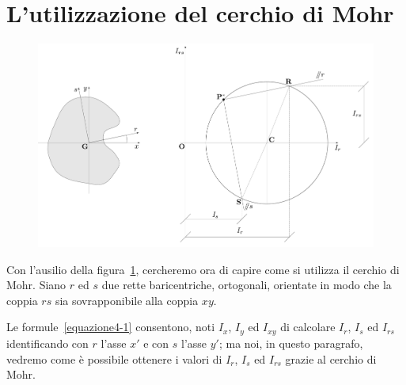 \section{L'utilizzazione del cerchio di Mohr}
\renewcommand{\thefigure}{5~-~2}
\begin{figure}[ht]
\centering
\includegraphics[width=\textwidth]{Immagini/Parte_5/Figura5_2/Figura5_2.pdf}
\caption{}
\label{figura5-2}
\end{figure}
\noindent Con l'ausilio della figura~\ref{figura5-2}, cercheremo ora di capire come si utilizza il cerchio di Mohr. Siano $r$ ed $s$ due rette baricentriche, ortogonali, orientate in modo che la coppia $rs$ sia sovrapponibile alla coppia $xy$. 

\noindent Le formule~\eqref{equazione4-1} consentono, noti $I_x$, $I_y$ ed $I_{xy}$ di calcolare $I_r$, $I_s$ ed $I_{rs}$ identificando con $r$ l'asse $x'$ e con $s$ l'asse $y'$; ma noi, in questo paragrafo, vedremo come è possibile ottenere i valori di $I_r$, $I_s$ ed $I_{rs}$ grazie al cerchio di Mohr.


